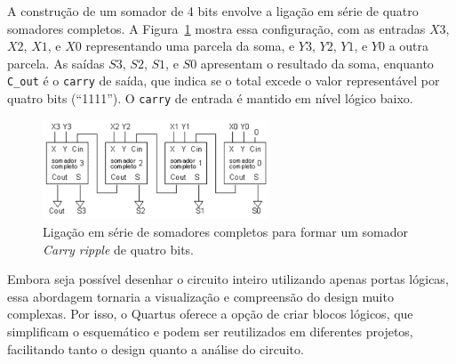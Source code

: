 \documentclass[12pt,a4paper]{article}
\begin{document}
A construção de um somador de 4 bits envolve a ligação em série de quatro somadores completos. A Figura~\ref{fig:somadorCompleto} mostra essa configuração, com as entradas $X3$, $X2$, $X1$, e $X0$ representando uma parcela da soma, e $Y3$, $Y2$, $Y1$, e $Y0$ a outra parcela. As saídas $S3$, $S2$, $S1$, e $S0$ apresentam o resultado da soma, enquanto \texttt{C\_out} é o \texttt{carry} de saída, que indica se o total excede o valor representável por quatro bits (``1111''). O \texttt{carry} de entrada é mantido em nível lógico baixo.

\begin{figure}[htbp!]
    \centering
    \includegraphics[width=0.6\textwidth]{./figs/somadorCompleto.png}
    \caption{Ligação em série de somadores completos para formar um somador \textit{Carry ripple} de quatro bits.}
    \label{fig:somadorCompleto}
\end{figure}

Embora seja possível desenhar o circuito inteiro utilizando apenas portas lógicas, essa abordagem tornaria a visualização e compreensão do design muito complexas. Por isso, o Quartus oferece a opção de criar blocos lógicos, que simplificam o esquemático e podem ser reutilizados em diferentes projetos, facilitando tanto o design quanto a análise do circuito.




\end{document}
